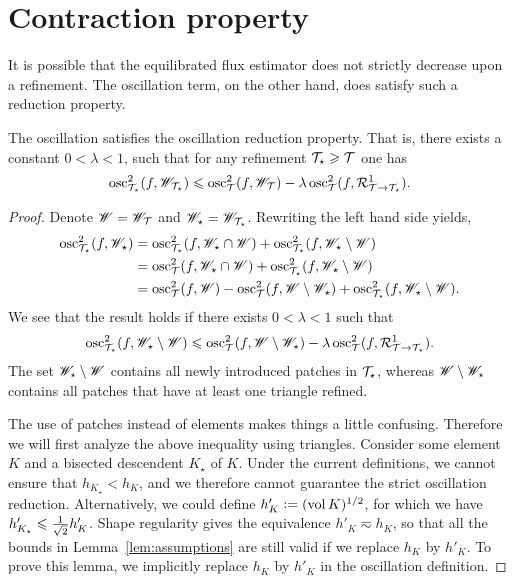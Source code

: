 \documentclass[thesis.tex]{subfiles}
\begin{document}
\section{Contraction property}
It is possible that the equilibrated flux estimator does not strictly decrease upon a refinement.
The oscillation term, on the other hand, does satisfy such a reduction property.
\begin{lem}
  \label{lem:oscasum}
  The oscillation satisfies the oscillation reduction property. That is, there exists a constant $0 < \lambda < 1$, such that for any refinement $\T_\star \geq \T$ one has
  \[
    \osc_{\T_\star}^2(f, \W_{\T_\star}) \leq \osc^2_{\T}(f, \W_{\T}) - \lambda \osc^2_{\T}(f, \RR^1_{\T \to \T_\star}).
  \]
\end{lem}
\begin{proof}
  Denote $\W = \W_{\T}$ and $\W_\star = \W_{\T_\star}$. Rewriting the left hand side yields,
  \begin{align*}
    \osc_{\T_\star}^2(f, \W_\star) &= \osc^2_{\T_\star}(f, \W_\star \cap \W) + \osc^2_{\T_\star}(f, \W_\star \setminus \W)\\
    &= \osc^2_{\T}(f, \W_\star \cap \W) + \osc^2_{\T_\star}(f, \W_\star \setminus \W)\\
    &= \osc^2_{\T}(f, \W) - \osc^2_{\T}(f, \W \setminus \W_\star) + \osc_{\T_\star}^2(f, \W_\star \setminus \W).
  \end{align*}
  We see that the result holds if there exists $0 < \lambda < 1$ such that
  \begin{equation}
    \label{eq:blabla}
    \osc_{\T_\star}^2(f, \W_\star \setminus \W) \leq \osc_{\T}^2(f, \W\setminus \W_\star) - \lambda \osc_\T^2(f, \RR^1_{\T \to \T_\star}).
  \end{equation}
  The set $\W_\star \setminus \W$ contains all newly introduced patches in $\T_\star$, whereas $\W \setminus \W_\star$ contains
  all patches that have at least one triangle refined.

  The use of patches instead of elements makes things a little confusing.  
  Therefore we will first analyze the above inequality using triangles.
  Consider some element $K$ and a bisected descendent $K_\star$ of $K$. Under the current definitions,
  we cannot ensure that $h_{K_\star} < h_K$, and we therefore cannot guarantee the strict oscillation reduction. 
  Alternatively, we could define $h'_K := (\vol K)^{1/2}$, for which we have $h'_{K_\star} \leq {1\over\sqrt{2}} h'_K$. 
  Shape regularity gives the equivalence $h'_K \eqsim h_K$, so that all the bounds in Lemma~\ref{lem:assumptions} are still
  valid if we replace $h_K$ by $h'_K$. To prove this lemma, we implicitly replace $h_K$ by
  $h'_K$ in the oscillation definition.


\end{proof}
\end{document}
